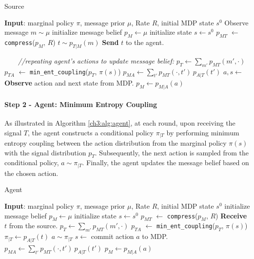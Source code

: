 \begin{algorithm}[h]
\caption{Source}\label{ch3:alg:source}
\begin{algorithmic}[1]
    \State \textbf{Input}: marginal policy $\pi$, message prior $\mu$, Rate $R$, initial MDP state $s^0$
    \State Observe message $m \sim \mu$
    \State initialize message belief $p_M \gets \mu$
    \State initialize state $s \gets s^0$
        \State $p_{MT}$ $\gets$ \texttt{compress}($p_M$, $R$)
        \State $t \sim p_{T|M}(m)$ 
        \State \textbf{Send} $t$ to the agent.
        
        \Statex \ \ \ \ \textit{//repeating agent's actions to update message belief:}
        \State $p_{T} \gets \sum_{m'} p_{MT}(m', \cdot)$ 
        \State $p_{TA}$ $\gets$ \texttt{min\_ent\_coupling}($p_T$, $\pi(s)$)
        \State $p_{MA} \gets \sum_{t'} p_{MT}(\cdot, t') \ p_{A|T}(t') $
        \State $a, s \gets$ \textbf{Observe} action and next state from MDP.
        \State $p_{M} \gets p_{M|A}(a)$
    \EndWhile
\end{algorithmic}
\end{algorithm}

\paragraph{Step 2 - Agent: Minimum Entropy Coupling}
As illustrated in Algorithm \ref{ch3:alg:agent}, at each round, upon receiving the signal $T$, the agent constructs a conditional policy $\pi_{|T}$ by performing minimum entropy coupling between the action distribution from the marginal policy \(\pi(s)\) with the signal distribution \(p_T\). Subsequently, the next action is sampled from the conditional policy, \(a \sim \pi_{|T}\). Finally, the agent updates the message belief based on the chosen action.

\begin{algorithm}[h]
\caption{Agent}\label{ch3:alg:agent}
\begin{algorithmic}[1]
    \State \textbf{Input}: marginal policy $\pi$, message prior $\mu$, Rate $R$, initial MDP state $s^0$
    \State initialize message belief $p_M \gets \mu$
    \State initialize state $s \gets s^0$
        \State $p_{MT}$ $\gets$ \texttt{compress}($p_M$, $R$)
        \State \textbf{Receive} $t$ from the source.
        \State $p_{T} \gets \sum_{m'} p_{MT}(m', \cdot)$
        \State $p_{TA}$ $\gets$ \texttt{min\_ent\_coupling}($p_T$, $\pi(s)$)
        \State $\pi_{|T} \gets p_{A|T}(t)$
        \State $a \sim \pi_{|T}$
        \State $s \gets $ commit action $a$ to MDP.
        \State $p_{MA} \gets \sum_{t'} p_{MT}(\cdot, t') \ p_{A|T}(t') $
        \State $p_{M} \gets p_{M|A}(a)$
    \EndWhile
    \end{algorithmic}
\end{algorithm}

